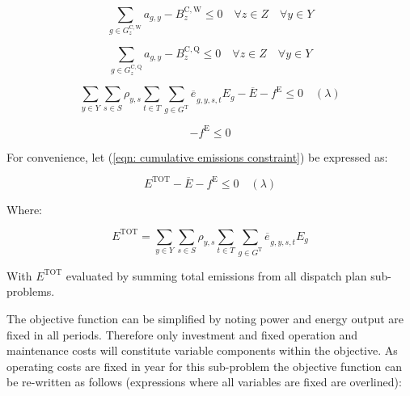 \documentclass{article}
\newcommand{\sGeneratorsCandidateWind}{G^{\mathrm{C,W}}}
\newcommand{\sGeneratorsThermal}{G^{\mathrm{T}}}
\newcommand{\sStorageCandidate}{G^{\mathrm{C,Q}}}
\newcommand{\sYears}{Y}
\newcommand{\sScenarios}{S}
\newcommand{\sIntervals}{T}
\newcommand{\sZones}{Z}
\newcommand{\iGenerator}{g}
\newcommand{\iYear}{y}
\newcommand{\iScenario}{s}
\newcommand{\iInterval}{t}
\newcommand{\iZone}{z}
\newcommand{\cScenarioDuration}[1][\iYear,\iScenario]{\rho_{#1}}
\newcommand{\cEmissionsIntensity}[1][\iGenerator]{E_{#1}}
\newcommand{\cBuildLimitWind}{B^{\mathrm{C,\mathrm{W}}}_{\iZone}}
\newcommand{\cBuildLimitStorage}{B^{\mathrm{C,\mathrm{Q}}}_{\iZone}}
\newcommand{\cEmmissionsCumulativeTarget}{\overline{E}}
\newcommand{\cEmissionsTotal}{E^{\mathrm{TOT}}}
\newcommand{\vEnergy}[1][\iGenerator,\iYear,\iScenario,\iInterval]{e_{#1}}
\newcommand{\vEmissionsTargetViolation}{f^{\mathrm{E}}}
\newcommand{\vInstalledCapacityTotal}[1][\iGenerator,\iYear]{a_{#1}}
\begin{document}
\begin{equation}
\sum\limits_{\iGenerator \in \sGeneratorsCandidateWind_{\iZone}} \vInstalledCapacityTotal - \cBuildLimitWind \leq 0 \quad \forall \iZone \in \sZones \quad \forall \iYear \in \sYears 
\end{equation}

\begin{equation}
\sum\limits_{\iGenerator \in \sStorageCandidate_{\iZone}} \vInstalledCapacityTotal - \cBuildLimitStorage \leq 0  \quad \forall \iZone \in \sZones \quad \forall \iYear \in \sYears
\label{eqn: storage build limit constraint}
\end{equation}

\begin{equation}
\sum\limits_{\iYear \in \sYears} \sum\limits_{\iScenario \in \sScenarios} \cScenarioDuration \sum\limits_{\iInterval \in \sIntervals} \sum\limits_{\iGenerator \in \sGeneratorsThermal} \overline{\vEnergy[]}_{\iGenerator,\iYear,\iScenario,\iInterval} \cEmissionsIntensity - \cEmmissionsCumulativeTarget - \vEmissionsTargetViolation \leq 0 \quad (\lambda)
	\label{eqn: cumulative emissions constraint}
\end{equation}

\begin{equation}
	- \vEmissionsTargetViolation \leq 0
	\label{eqn: non-negative emissions constraint violation}
\end{equation}

For convenience, let (\ref{eqn: cumulative emissions constraint}) be expressed as:

\begin{equation}
	\cEmissionsTotal - \cEmmissionsCumulativeTarget - \vEmissionsTargetViolation \leq 0 \quad (\lambda)
\end{equation}

Where:

\begin{equation}
	\cEmissionsTotal = \sum\limits_{\iYear \in \sYears} \sum\limits_{\iScenario \in \sScenarios} \cScenarioDuration \sum\limits_{\iInterval \in \sIntervals} \sum\limits_{\iGenerator \in \sGeneratorsThermal} \overline{\vEnergy[]}_{\iGenerator,\iYear,\iScenario,\iInterval} \cEmissionsIntensity
\end{equation}

With $\cEmissionsTotal$ evaluated by summing total emissions from all dispatch plan sub-problems. 

The objective function can be simplified by noting power and energy output are fixed in all periods. Therefore only investment and fixed operation and maintenance costs will constitute variable components within the objective. As operating costs are fixed in year for this sub-problem the objective function can be re-written as follows (expressions where all variables are fixed are overlined): 
\end{document}

